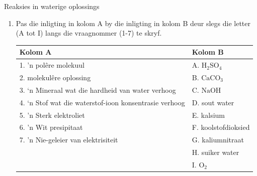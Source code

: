 {{\begin{eocexercises}{Reaksies in waterige oplossings}
\begin{enumerate}[noitemsep, label=\textbf{\arabic*}. ]
\label{m38719*uid112}\item Pas die inligting in kolom A by die inligting in kolom B deur slegs die letter (A tot I) langs die vraagnommer (1-7) te skryf.
          \begin{table}[H]
        \begin{center}
      \label{m38719*id342952}
    \noindent
      \begin{tabular}{|l|l|}\hline
        \textbf{Kolom A} &
        \textbf{Kolom B} \\ \hline
        1. 'n pol\^{e}re molekuul &
        A. ${\text{H}}_{2}{\text{SO}}_{4}$ \\ \hline
        2. molekul\^{e}re oplossing &
        B. ${\text{CaCO}}_{3}$ \\ \hline
        3. ‘n Mineraal wat die hardheid van water verhoog &
        C. $\text{NaOH}$ \\ \hline
        4.  ‘n Stof wat die waterstof-ioon konsentrasie verhoog &
        D. sout water \\ \hline
        5.  'n Sterk elektroliet &
        E. kalsium \\ \hline
        6.  'n Wit presipitaat &
        F. koolstofdioksied \\ \hline
        7. 'n Nie-geleier van elektrisiteit &
        G. kaliumnitraat \\ \hline
         &
        H. suiker water \\ \hline
         &
        I. ${\text{O}}_{2}$ \\ \hline
    \end{tabular}
      \end{center}
\end{table}
    \par


\end{enumerate}
\end{eocexercises}}}
